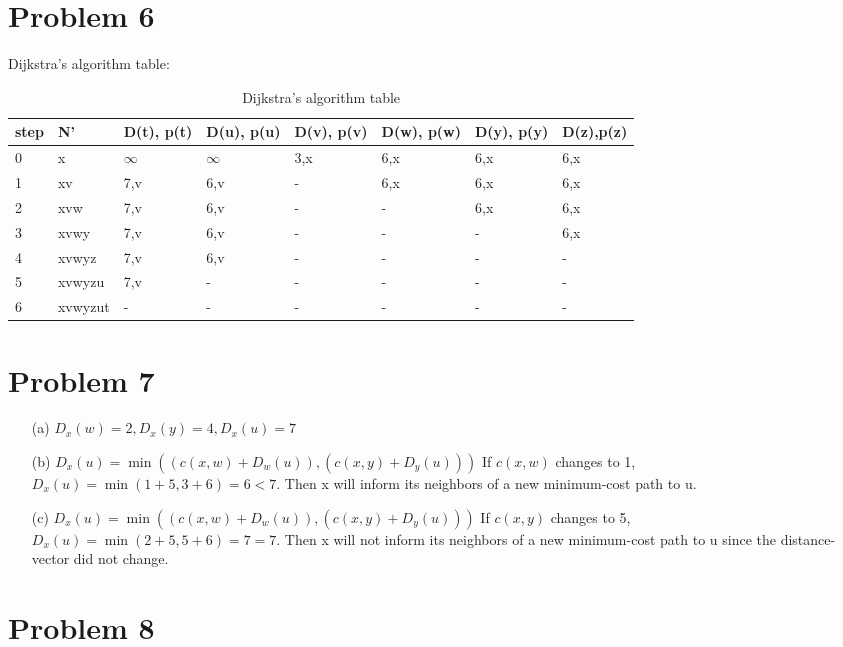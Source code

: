 \documentclass[12pt,a4paper]{article}
\begin{document}
\section*{Problem 6}
Dijkstra's algorithm table:
\begin{table}[!ht]
    \centering
    \begin{tabular}{|l|l|l|l|l|l|l|l|}
    \hline
        step & N' & D(t), p(t) & D(u), p(u) & D(v), p(v) & D(w), p(w) & D(y), p(y) & D(z),p(z) \\ \hline
        0 & x & $\infty$ & $\infty$ & 3,x & 6,x & 6,x & 6,x \\ \hline
        1 & xv & 7,v & 6,v & - & 6,x & 6,x & 6,x \\ \hline
        2 & xvw & 7,v & 6,v & - & - & 6,x & 6,x \\ \hline
        3 & xvwy & 7,v & 6,v & - & - & - & 6,x \\ \hline
        4 & xvwyz & 7,v & 6,v & - & - & - & - \\ \hline
        5 & xvwyzu & 7,v & - & - & - & - & - \\ \hline
        6 & xvwyzut & - & - & - & - & - & - \\ \hline
    \end{tabular}
    \caption{Dijkstra's algorithm table}
\end{table}
\section*{Problem 7}

\begin{enumerate}
    \item [(a)] 
        $D_{x}(w) = 2, D_{x}(y) = 4, D_{x}(u) = 7$
    \item[(b)]
        $D_{x}(u) = \min((c(x,w) + D_{w}(u)), (c(x,y) + D_{y}(u)))$ If $c(x,w)$ changes to 1, $D_{x}(u) = \min(1+5, 3+6) = 6 < 7$.
        Then x will inform its neighbors of a new minimum-cost path to u.
    \item[(c)]
        $D_{x}(u) = \min((c(x,w) + D_{w}(u)), (c(x,y) + D_{y}(u)))$ If $c(x,y)$ changes to 5, $D_{x}(u) = \min(2+5, 5+6) = 7 = 7$.
        Then x will not inform its neighbors of a new minimum-cost path to u since the distance-vector did not change.
        
\end{enumerate}

\section*{Problem 8}
\end{document}
